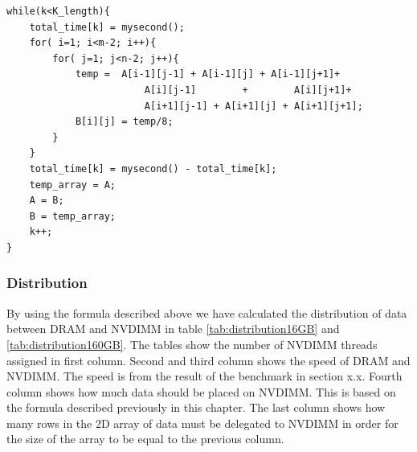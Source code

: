 \documentclass[12pt,a4paper,USenglish]{article}      %
\begin{document}
\begin{lstlisting}[caption={Serial code of the code that will be used in the first and second version.}, label={lst:LABserial}]
while(k<K_length){
	total_time[k] = mysecond();
	for( i=1; i<m-2; i++){
		for( j=1; j<n-2; j++){
			temp =  A[i-1][j-1] + A[i-1][j] + A[i-1][j+1]+
					    A[i][j-1]        +        A[i][j+1]+
					    A[i+1][j-1] + A[i+1][j] + A[i+1][j+1];
			B[i][j] = temp/8;
		}
	}
	total_time[k] = mysecond() - total_time[k];
	temp_array = A;
	A = B;
	B = temp_array;
	k++;
}
\end{lstlisting}

\subsubsection{Distribution}
By using the formula described above we have calculated the distribution of data between DRAM and NVDIMM in table \ref{tab:distribution16GB} and \ref{tab:distribution160GB}. The tables show the number of NVDIMM threads assigned in first column. Second and third column shows the speed of DRAM and NVDIMM. The speed is from the result of the benchmark in section x.x. Fourth column shows how much data should be placed on NVDIMM. This is based on the formula described previously in this chapter. The last column shows how many rows in the 2D array of data must be delegated to NVDIMM in order for the size of the array to be equal to the previous column.
\end{document}

